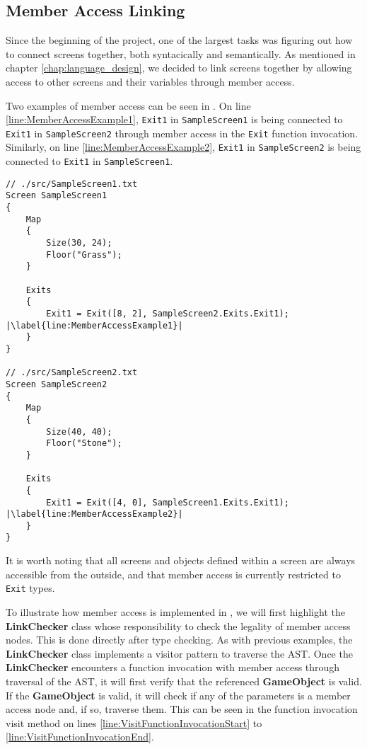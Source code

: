 \subsection*{Member Access Linking} \label{sec:Linker}
Since the beginning of the project, one of the largest tasks was figuring out how to connect screens together, both syntacically and semantically. 
As mentioned in chapter \ref{chap:language_design}, we decided to link screens together by allowing access to other screens and their variables through member access. 


Two examples of member access can be seen in . 
On line \ref{line:MemberAccessExample1}, \texttt{Exit1} in \texttt{SampleScreen1} is being connected to \texttt{Exit1} in \texttt{SampleScreen2} through member access in the \texttt{Exit} function invocation.
Similarly, on line \ref{line:MemberAccessExample2}, \texttt{Exit1} in \texttt{SampleScreen2} is being connected to \texttt{Exit1} in \texttt{SampleScreen1}.

\begin{lstlisting}[language=CSharp, caption={\dazel{} source code example of member access.}, label={lst:LinkingExample},escapechar=|]
// ./src/SampleScreen1.txt
Screen SampleScreen1 
{
	Map 
	{
		Size(30, 24);
		Floor("Grass");
	}
	
	Exits 
	{
		Exit1 = Exit([8, 2], SampleScreen2.Exits.Exit1); |\label{line:MemberAccessExample1}|
	}
}

// ./src/SampleScreen2.txt
Screen SampleScreen2
{
	Map 
	{
		Size(40, 40);
		Floor("Stone");
	}
	
	Exits 
	{
		Exit1 = Exit([4, 0], SampleScreen1.Exits.Exit1); |\label{line:MemberAccessExample2}|
	}
}
\end{lstlisting}

It is worth noting that all screens and objects defined within a screen are always accessible from the outside, and that member access is currently restricted to \texttt{Exit} types.


To illustrate how member access is implemented in \dazel{}, we will first highlight the \textbf{LinkChecker} class whose responsibility to check the legality of member access nodes. This is done directly after type checking.
As with previous examples, the \textbf{LinkChecker} class implements a visitor pattern to traverse the AST.
Once the \textbf{LinkChecker} encounters a function invocation with member access through traversal of the AST, it will first verify that the referenced \textbf{GameObject} is valid. 
If the \textbf{GameObject} is valid, it will check if any of the parameters is a member access node and, if so, traverse them. This can be seen in the function invocation visit method on lines \ref{line:VisitFunctionInvocationStart} to \ref{line:VisitFunctionInvocationEnd}. 

